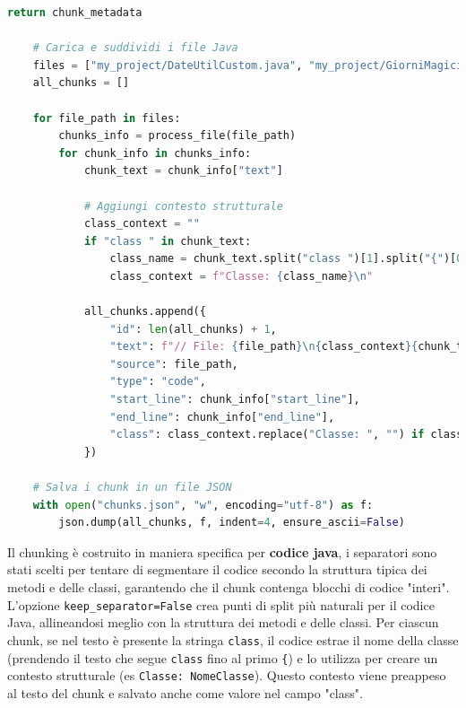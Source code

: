 \documentclass[12pt,a4paper,openright,twoside]{book}
\begin{document}
\begin{lstlisting}[language=Python, caption={Codice Python per la suddivisione dei file Java in chunk}, label={lst:chunking}]
        return chunk_metadata
    
    # Carica e suddividi i file Java
    files = ["my_project/DateUtilCustom.java", "my_project/GiorniMagici.java", "my_project/BasketballStats.java"]
    all_chunks = []
    
    for file_path in files:
        chunks_info = process_file(file_path)
        for chunk_info in chunks_info:
            chunk_text = chunk_info["text"]
            
            # Aggiungi contesto strutturale
            class_context = ""
            if "class " in chunk_text:
                class_name = chunk_text.split("class ")[1].split("{")[0].strip()
                class_context = f"Classe: {class_name}\n"
            
            all_chunks.append({
                "id": len(all_chunks) + 1,
                "text": f"// File: {file_path}\n{class_context}{chunk_text}",
                "source": file_path,
                "type": "code",
                "start_line": chunk_info["start_line"],
                "end_line": chunk_info["end_line"],
                "class": class_context.replace("Classe: ", "") if class_context else ""
            })
    
    # Salva i chunk in un file JSON
    with open("chunks.json", "w", encoding="utf-8") as f:
        json.dump(all_chunks, f, indent=4, ensure_ascii=False)
\end{lstlisting}
Il chunking è costruito in maniera specifica per \textbf{codice java}, i separatori sono stati scelti per tentare di segmentare il codice secondo la struttura tipica dei metodi e delle classi, garantendo che il chunk contenga blocchi di codice "interi".
L'opzione \texttt{keep\_separator=False} crea punti di split più naturali per il codice Java, allineandosi meglio con la struttura dei metodi e delle classi.
Per ciascun chunk, se nel testo è presente la stringa \texttt{class}, il codice estrae il nome della classe 
(prendendo il testo che segue \texttt{class} fino al primo \texttt{\{}) e lo utilizza per creare un contesto 
strutturale (es \texttt{Classe: NomeClasse}).
Questo contesto viene preappeso al testo del chunk e salvato anche come valore nel campo "class".
\end{document}
